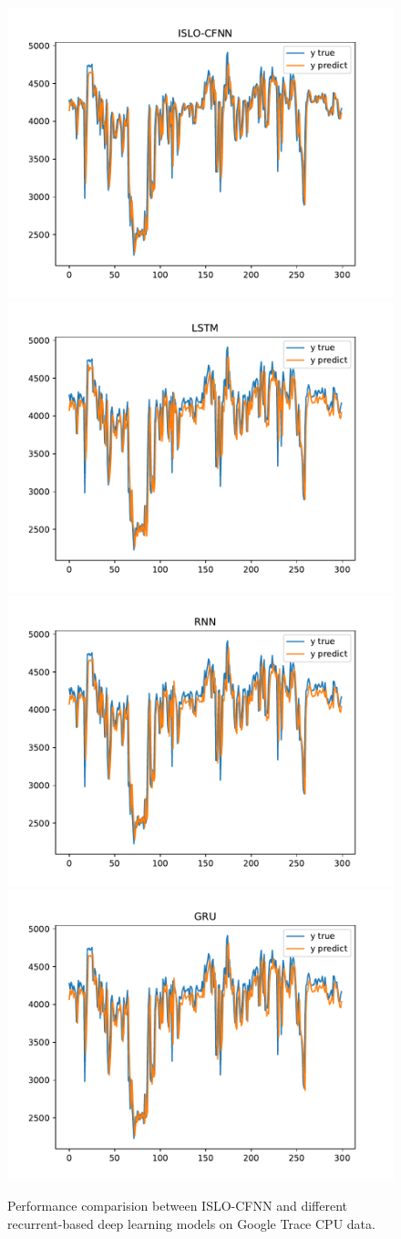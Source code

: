 \documentclass[a4paper,13pt,2p]{report}
\begin{document}
\begin{figure}[!ht] 
   \centering
   	\includegraphics[width=0.49\linewidth]{pdf/result_data/cpu/ISLO_CFNN_cpu}
  	 \includegraphics[width=0.49\linewidth]{pdf/result_data/cpu/LSTM_cpu}
  	 \includegraphics[width=0.49\linewidth]{pdf/result_data/cpu/RNN_cpu}
  	 \includegraphics[width=0.49\linewidth]{pdf/result_data/cpu/GRU_cpu}
	
  \caption{Performance comparision between ISLO-CFNN and different recurrent-based deep learning models on Google Trace CPU data.} 
  \label{fig_result_cpu_islo_rnn} 
\end{figure}
	
\end{document}
